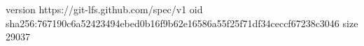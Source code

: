 version https://git-lfs.github.com/spec/v1
oid sha256:767190c6a52423494ebed0b16f9b62e16586a55f25f71df34ceccf67238c3046
size 29037
